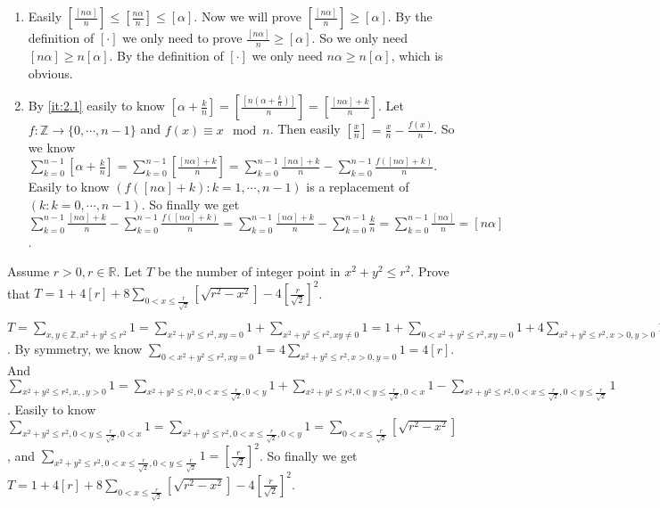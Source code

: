 \documentclass{ctexart}
\begin{document}
\begin{solution}
	\begin{enumerate}
		\item \label{it:2.1} Easily \(\left[\frac{[n \alpha]}{n}\right]\leq\left[\frac{n \alpha}{n}\right] \leq[\alpha]\).
		      Now we will prove \(\left[\frac{[n \alpha]}{n}\right]\geq [\alpha]\).
		      By the definition of \([\cdot]\) we only need to prove \(\frac{[n \alpha]}{n}\geq [\alpha]\).
		      So we only need \([n \alpha]\geq n [\alpha]\).
		      By the definition of \([\cdot]\) we only need \(n \alpha \geq n[\alpha]\), which is obvious.
		\item By \ref{it:2.1} easily to know \([\alpha+\frac{k}{n}]=\left[\frac{[n(\alpha+\frac{k}{n})]}{n}\right]=
		      \left[\frac{[n \alpha]+k}{n}\right]\).
		      Let \(f:\mathbb{Z} \to \{0,\cdots,n-1\}\) and \(f(x)\equiv x \mod n\).
		      Then easily \([\frac{x}{n}]=\frac{x}{n}-\frac{f(x)}{n}\).
		      So we know \(\sum_{k=0}^{n-1}[\alpha+\frac{k}{n}]=\sum_{k=0}^{n-1}[\frac{[n \alpha]+k}{n}]=
		      \sum_{k=0}^{n-1}\frac{[n \alpha]+k}{n}-\sum_{k=0}^{n-1}\frac{f([n \alpha]+k)}{n}\).
		      Easily to know \((f([n \alpha]+k):k=1,\cdots,n-1)\) is a replacement of \((k:k=0,\cdots,n-1)\).
		      So finally we get \(\sum_{k=0}^{n-1}\frac{[n \alpha]+k}{n}-\sum_{k=0}^{n-1}\frac{f([n \alpha]+k)}{n}=\sum_{k=0}^{n-1}\frac{[n \alpha]+k}{n}-\sum_{k=0}^{n-1}\frac{k}{n}=\sum_{k=0}^{n-1}\frac{[n \alpha]}{n}=[n \alpha]\).
	\end{enumerate}
\end{solution}
\begin{problem}\label{pro:p16.4.3}
Assume \(r>0,r \in \mathbb{R}\). Let \(T\) be the number of integer point in  \(x^2 + y^2 \leq r^2\).
Prove that \(T = 1 + 4[r] + 8 \sum_{0<x \leq \frac{r}{\sqrt{2}}}[\sqrt{r^2-x^2}] -4\left[\frac{r}{\sqrt{2}}\right]^2\).
\end{problem}
\begin{solution}
	\(T=\sum_{x,y \in \mathbb{Z},x^2 + y^2 \leq r^2}1=\sum_{x^2 + y^2 \leq r^2,xy=0} 1 +\sum_{x^2+y^2 \leq r^2,xy \neq 0} 1=
	1+\sum_{0<x^2 + y^2 \leq r^2,xy=0} 1 +4 \sum_{x^2 + y^2 \leq r^2,x>0,y>0} 1\).
	By symmetry, we know \(\sum_{0<x^2 + y^2 \leq r^2,xy=0} 1 =4\sum_{x^2 + y^2 \leq r^2,x >0,y=0} 1=4[r]\).
	And \(\sum_{x^2 + y^2 \leq r^2,x,,y>0} 1 =\sum_{x^2+y^2 \leq r^2,0<x \leq \frac{r}{\sqrt{2}},0<y} 1 + \sum_{x^2+y^2 \leq r^2,0<y \leq \frac{r}{\sqrt{2}},0<x} 1 -\sum_{x^2+y^2 \leq r^2,0<x \leq \frac{r}{\sqrt{2}},0<y \leq \frac{r}{\sqrt{2}}} 1\).
	Easily to know \(\sum_{x^2+y^2 \leq r^2,0<y \leq \frac{r}{\sqrt{2}},0<x} 1 =\sum_{x^2+y^2 \leq r^2,0<x \leq \frac{r}{\sqrt{2}},0<y} 1 =\sum_{0<x \leq \frac{r}{\sqrt{2}}}[\sqrt{r^2-x^2}]\),
	and \(\sum_{x^2+y^2 \leq r^2,0<x \leq \frac{r}{\sqrt{2}},0<y \leq \frac{r}{\sqrt{2}}} 1=\left[\frac{r}{\sqrt{2}}\right]^2\).
	So finally we get \(T = 1 + 4[r] + 8 \sum_{0<x \leq \frac{r}{\sqrt{2}}}[\sqrt{r^2-x^2}] -4\left[\frac{r}{\sqrt{2}}\right]^2\).
\end{solution}
\end{document}
